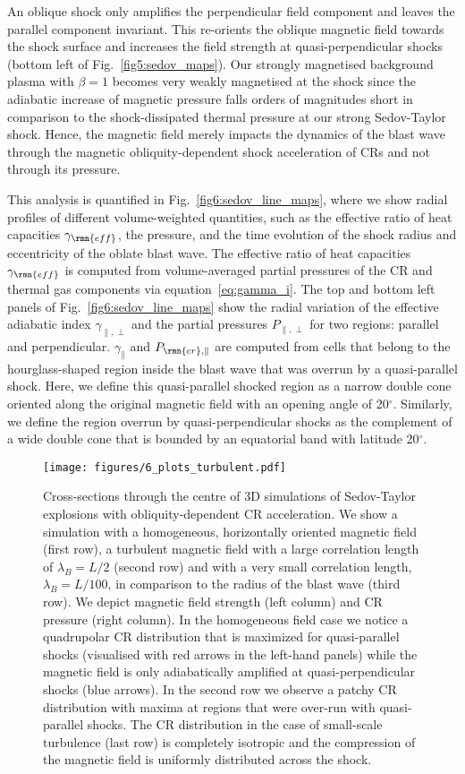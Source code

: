 \documentclass[8pt,a4paper,usenatbib]{mnras}
\newcommand{\CR}{\rmn{cr}}
\begin{document}
An oblique shock only amplifies the perpendicular field component and leaves the
parallel component invariant. This re-orients the oblique magnetic field towards
the shock surface and increases the field strength at quasi-perpendicular shocks
(bottom left of Fig.~\ref{fig5:sedov_maps}). Our strongly magnetised background
plasma with $\beta=1$ becomes very weakly magnetised at the shock since the
adiabatic increase of magnetic pressure falls orders of magnitudes short in
comparison to the shock-dissipated thermal pressure at our strong Sedov-Taylor
shock. Hence, the magnetic field merely impacts the dynamics of the blast wave
through the magnetic obliquity-dependent shock acceleration of CRs and not
through its pressure.

This analysis is quantified in Fig.~\ref{fig6:sedov_line_maps}, where we show
radial profiles of different volume-weighted quantities, such as the effective
ratio of heat capacities $\gamma_{\rmn{eff}}$, the pressure, and the time evolution of the
shock radius and eccentricity of the oblate blast wave. The effective ratio of
heat capacities $\gamma_{\rmn{eff}}$ is computed from volume-averaged partial
pressures of the CR and thermal gas components via equation~\ref{eq:gamma_i}.
The top and bottom left panels of Fig.~\ref{fig6:sedov_line_maps} show the
radial variation of the effective adiabatic index $\gamma_{\parallel,\perp}$ and the partial
pressures $P_{\parallel,\perp}$ for two regions: parallel and perpendicular. $\gamma_\parallel$ and
$P_{\CR,\parallel}$ are computed from cells that belong to the hourglass-shaped
region inside the blast wave that was overrun by a quasi-parallel shock.  Here,
we define this quasi-parallel shocked region as a narrow double cone oriented
along the original magnetic field with an opening angle of
20$^\circ$. Similarly, we define the region overrun by quasi-perpendicular
shocks as the complement of a wide double cone that is bounded by an equatorial
band with latitude 20$^\circ$.
\begin{figure*}
\centering
\texttt{[image: figures/6\_plots\_turbulent.pdf]} 
\caption{Cross-sections through the centre of 3D simulations of Sedov-Taylor
  explosions with obliquity-dependent CR acceleration. We show a simulation with
  a homogeneous, horizontally oriented magnetic field (first row), a turbulent
  magnetic field with a large correlation length of $\lambda_B=L/2$ (second row)
  and with a very small correlation length, $\lambda_B=L/100$, in comparison to
  the radius of the blast wave (third row). We depict magnetic field strength
  (left column) and CR pressure (right column). In the homogeneous field case we
  notice a quadrupolar CR distribution that is maximized for quasi-parallel
  shocks (visualised with red arrows in the left-hand panels) while the magnetic
  field is only adiabatically amplified at quasi-perpendicular shocks (blue
  arrows). In the second row we observe a patchy CR distribution with maxima at
  regions that were over-run with quasi-parallel shocks. The CR distribution in
  the case of small-scale turbulence (last row) is completely isotropic and the
  compression of the magnetic field is uniformly distributed across the shock.}
\label{fig7:6_plots_turbulent}
\end{figure*}
\end{document}
